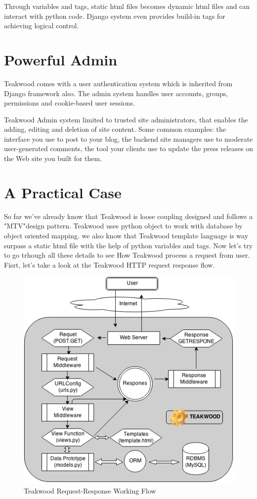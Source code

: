 Through variables and tags, static html files becomes dynamic html files and can interact with python code. Django system even provides build-in tags for achieving logical control.


\section{Powerful Admin}
Teakwood comes with a user authentication system which is inherited from Django framework also. The admin system handles user accounts, groups, permissions and cookie-based user sessions. 

Teakwood Admin system limited to trusted site administrators, that enables the adding, editing and deletion of site content. Some common examples: the interface you use to post to your blog, the backend site managers use to moderate user-generated comments, the tool your clients use to update the press releases on the Web site you built for them.

\section{A Practical Case}

So far we've already know that Teakwood is loose coupling designed and follows a "MTV"design pattern. Teakwood uses python object to work with database by object oriented mapping. we also know that Teakwood template language is way surpass a static html file with the help of python variables and tags. Now let's try to go trhough all these details to see How Teakwood process a request from user. Fisrt, let's take a look at the Teakwood HTTP request response flow.
\begin{figure}[htb]
\centering
\includegraphics[scale=0.6]{./http_request_response}
\caption{Teakwood Request-Response Working Flow}
\label{fig:label} %
\end{figure}



